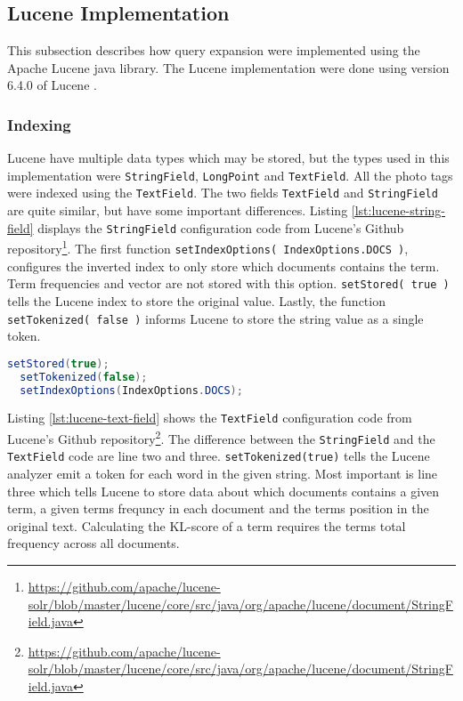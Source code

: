 \subsection{Lucene Implementation}
\label{sec:lucene}
This subsection describes how query expansion were implemented using the Apache Lucene java library.
The Lucene implementation were done using version 6.4.0 of Lucene \cite{lucene-documentation}.

\subsubsection{Indexing}
Lucene have multiple data types which may be stored,
but the types used in this implementation were \texttt{StringField}, \texttt{LongPoint} and \texttt{TextField}.
All the photo tags were indexed using the \texttt{TextField}.
The two fields \texttt{TextField} and \texttt{StringField} are quite similar,
but have some important differences.
Listing \ref{lst:lucene-string-field} displays the \texttt{StringField} configuration code from Lucene's Github repository\footnote{\url{https://github.com/apache/lucene-solr/blob/master/lucene/core/src/java/org/apache/lucene/document/StringField.java}}.
The first function \texttt{setIndexOptions( IndexOptions.DOCS )},
configures the inverted index to only store which documents contains the term.
Term frequencies and vector are not stored with this option.
\texttt{setStored( true )} tells the Lucene index to store the original value.
Lastly, the function \texttt{setTokenized( false )} informs Lucene to store the string value as a single token.

\begin{lstlisting}[language=java, caption={Lucene's \texttt{StringField} index configuration.}, label={lst:lucene-string-field}]
  setStored(true);
  setTokenized(false);
  setIndexOptions(IndexOptions.DOCS);
\end{lstlisting}

Listing \ref{lst:lucene-text-field} shows the \texttt{TextField} configuration code from Lucene's Github repository\footnote{\url{https://github.com/apache/lucene-solr/blob/master/lucene/core/src/java/org/apache/lucene/document/StringField.java}}.
The difference between the \texttt{StringField} and the \texttt{TextField} code are line two and three.
\texttt{setTokenized(true)} tells the Lucene analyzer emit a token for each word in the given string.
Most important is line three which tells Lucene to store data about which documents contains a given term,
a given terms frequncy in each document and the terms position in the original text.
Calculating the KL-score of a term requires the terms total frequency across all documents.

